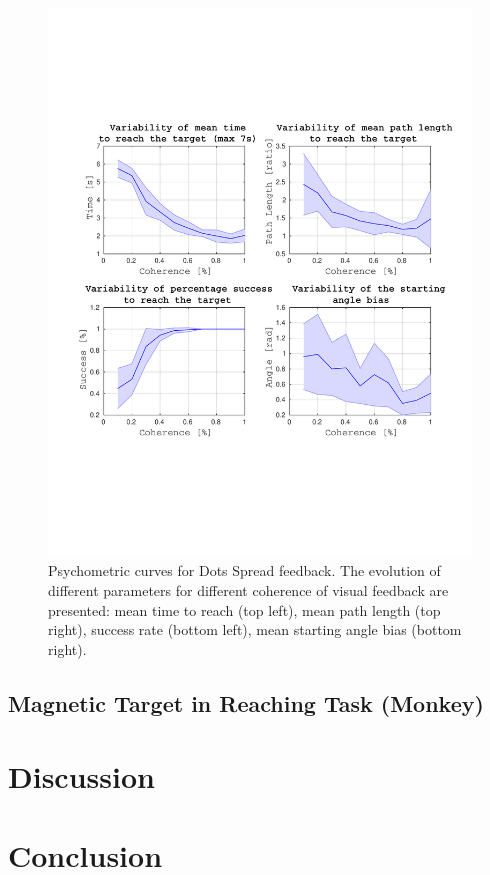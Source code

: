 \documentclass[preprint,12pt]{elsarticle}
\begin{document}
\begin{figure}[htbp]
\includegraphics[width=1\textwidth,trim={1.5cm 5cm 1.2cm 5cm},clip]{figures/SD_mean_human.pdf}
\caption{Psychometric curves for Dots Spread feedback. The evolution of different parameters for different coherence of visual feedback are presented: mean time to reach (top left), mean path length (top right), success rate (bottom left), mean starting angle bias (bottom right).}
\label{fig:SD}
\end{figure}
\subsection{Magnetic Target in Reaching Task (Monkey)}


\section{Discussion}
\section{Conclusion}
\end{document}
